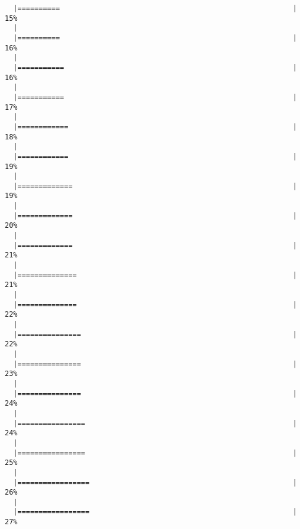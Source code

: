 \begin{knitrout}
\begin{kframe}
\begin{verbatim}
  |==========                                                       |  15%
  |                                                                       
  |==========                                                       |  16%
  |                                                                       
  |===========                                                      |  16%
  |                                                                       
  |===========                                                      |  17%
  |                                                                       
  |============                                                     |  18%
  |                                                                       
  |============                                                     |  19%
  |                                                                       
  |=============                                                    |  19%
  |                                                                       
  |=============                                                    |  20%
  |                                                                       
  |=============                                                    |  21%
  |                                                                       
  |==============                                                   |  21%
  |                                                                       
  |==============                                                   |  22%
  |                                                                       
  |===============                                                  |  22%
  |                                                                       
  |===============                                                  |  23%
  |                                                                       
  |===============                                                  |  24%
  |                                                                       
  |================                                                 |  24%
  |                                                                       
  |================                                                 |  25%
  |                                                                       
  |=================                                                |  26%
  |                                                                       
  |=================                                                |  27%

\end{verbatim}
\end{kframe}
\end{knitrout}
